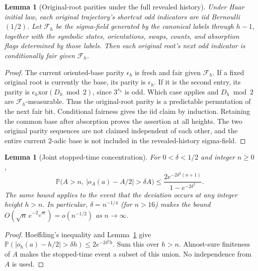 \documentclass[11pt]{amsart}
\newtheorem{lemma}[theorem]{Lemma}
\theoremstyle{definition}
\theoremstyle{remark}
\newcommand{\PP}{\mathbb P}
\begin{document}
\begin{lemma}[Original-root parities under the full revealed history]
\label{ordinary:parities}
Under Haar initial law, each original trajectory's shortcut odd indicators
are iid Bernoulli$(1/2)$. Let $\mathcal F_h$ be the sigma-field generated by the canonical
labels through $h-1$, together with the symbolic states, orientations,
swaps, counts, and absorption flags determined by those labels.
Then each original root's next odd indicator is conditionally fair
 given $\mathcal F_h$.
\end{lemma}
\begin{proof}
The current oriented-base parity $\epsilon_h$ is fresh and fair given
$\mathcal F_h$. If a fixed original root is currently the base, its parity
is $\epsilon_h$. If it is the second entry, its parity is
$\epsilon_h\mathbin{\mathrm{xor}}(D_h\bmod2)$, since $3^{s_h}$ is odd.
Which case applies and $D_h\bmod2$ are $\mathcal F_h$-measurable.
Thus the original-root parity is a predictable permutation of the next
fair bit. Conditional fairness gives the iid claim by induction. Retaining
the common base after absorption proves the assertion at all heights.
The two original parity sequences are not claimed independent of each
other, and the entire current $2$-adic base is not included in the
revealed-history sigma-field.
\end{proof}

\begin{lemma}[Joint stopped-time concentration]\label{ordinary:concentration}
For $0<\delta<1/2$ and integer $n\ge0$,
\[
 \PP\bigl(A>n,\ |o_A(a)-A/2|>\delta A\bigr)
 \le \frac{2e^{-2\delta^2(n+1)}}{1-e^{-2\delta^2}}.
\]
The same bound applies to the event that the deviation occurs at any
integer height $h>n$. In particular, $\delta=n^{-1/4}$ (for $n>16$) makes the bound
$O(\sqrt n\,e^{-2\sqrt n})=o(n^{-1/2})$ as $n\to\infty$.
\end{lemma}
\begin{proof}
Hoeffding's inequality and Lemma~\ref{ordinary:parities} give
$\PP(|o_h(a)-h/2|>\delta h)\le2e^{-2\delta^2h}$.
Sum this over $h>n$. Almost-sure finiteness of $A$ makes the stopped-time
event a subset of this union. No independence from $A$ is used.
\end{proof}
\end{document}
